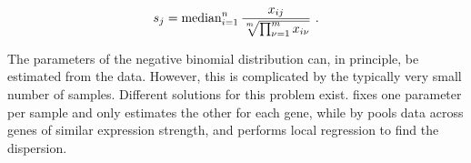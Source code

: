\begin{equation}
    s_j = \operatorname{median}_{i = 1}^n
        \frac{x_{ij}}{\sqrt[\uproot{2}m]{\prod_{\nu = 1}^m x_{i\nu}}}
        \text{\ .}
\end{equation}

The parameters of the negative binomial distribution can, in principle, be
estimated from the data. However, this is complicated by the typically very
small number of samples. Different solutions for this problem exist.
 \citep{Robinson:2010} fixes one parameter per sample and only
estimates the other for each gene, while  by \citet{Anders:2010}
pools data across genes of similar expression strength, and performs local
regression to find the dispersion.
